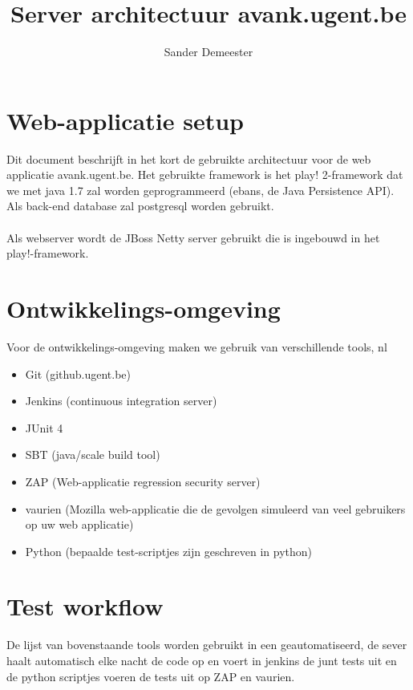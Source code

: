 \documentclass[10pt,a4paper]{report}
\author{Sander Demeester}
\begin{document}
\title{Server architectuur avank.ugent.be}
\section*{Web-applicatie setup}
Dit document beschrijft in het kort de gebruikte architectuur voor de web applicatie avank.ugent.be.
Het gebruikte framework is het play! 2-framework dat we met java 1.7 zal worden geprogrammeerd (ebans, de Java Persistence API). Als back-end database zal postgresql worden gebruikt.\\
\\
Als webserver wordt de JBoss Netty server gebruikt die is ingebouwd in het play!-framework.
\section*{Ontwikkelings-omgeving}
Voor de ontwikkelings-omgeving maken we gebruik van verschillende tools, nl
\begin{itemize}
\item Git (github.ugent.be)
\item Jenkins (continuous integration server)
\item JUnit 4
\item SBT (java/scale build tool)
\item ZAP (Web-applicatie regression security server)
\item vaurien (Mozilla web-applicatie die de gevolgen simuleerd van veel gebruikers op uw web applicatie)
\item Python (bepaalde test-scriptjes zijn geschreven in python)
\end{itemize}
\section*{Test workflow}
De lijst van bovenstaande tools worden gebruikt in een geautomatiseerd, de sever haalt automatisch elke nacht de code op en voert in jenkins de junt tests uit en de python scriptjes voeren de tests uit op ZAP en vaurien.
\end{document}
